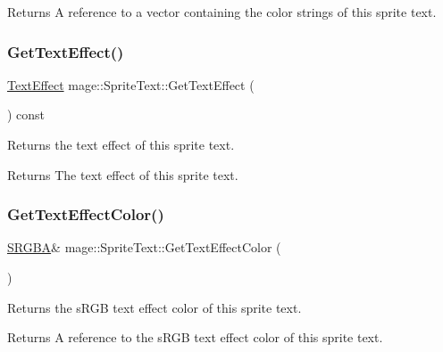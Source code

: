 \begin{DoxyReturn}{Returns}
A reference to a vector containing the color strings of this sprite text. 
\end{DoxyReturn}
\hypertarget{classmage_1_1_sprite_text_a1f5b83df9a7332ac3774a038df169847}{}\label{classmage_1_1_sprite_text_a1f5b83df9a7332ac3774a038df169847} 
\subsubsection{\texorpdfstring{Get\+Text\+Effect()}{GetTextEffect()}}
{\footnotesize\ttfamily \hyperlink{classmage_1_1_sprite_text_ac60331e941d1f76551b7bdfad6ee7324}{Text\+Effect} mage\+::\+Sprite\+Text\+::\+Get\+Text\+Effect (\begin{DoxyParamCaption}{ }\end{DoxyParamCaption}) const\hspace{0.3cm}{\ttfamily [noexcept]}}

Returns the text effect of this sprite text.

\begin{DoxyReturn}{Returns}
The text effect of this sprite text. 
\end{DoxyReturn}
\hypertarget{classmage_1_1_sprite_text_a0b8d0df75efa9dd9e666b68db6ee71b5}{}\label{classmage_1_1_sprite_text_a0b8d0df75efa9dd9e666b68db6ee71b5} 
\subsubsection{\texorpdfstring{Get\+Text\+Effect\+Color()}{GetTextEffectColor()}\hspace{0.1cm}{\footnotesize\ttfamily [1/2]}}
{\footnotesize\ttfamily \hyperlink{structmage_1_1_s_r_g_b_a}{S\+R\+G\+BA}\& mage\+::\+Sprite\+Text\+::\+Get\+Text\+Effect\+Color (\begin{DoxyParamCaption}{ }\end{DoxyParamCaption})\hspace{0.3cm}{\ttfamily [noexcept]}}

Returns the s\+R\+GB text effect color of this sprite text.

\begin{DoxyReturn}{Returns}
A reference to the s\+R\+GB text effect color of this sprite text. 
\end{DoxyReturn}
\hypertarget{classmage_1_1_sprite_text_af9f15b5b215e1433cee2152a5ce5e299}{}\label{classmage_1_1_sprite_text_af9f15b5b215e1433cee2152a5ce5e299} 
